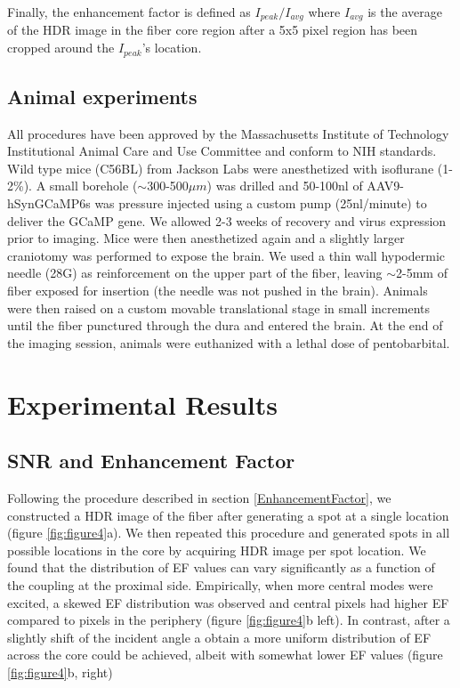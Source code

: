 \documentclass[10pt]{article}
\begin{document}
Finally, the enhancement factor is defined as $I_{peak} / I_{avg}$ where $I_{avg}$ is the average of the HDR image in the fiber core region after a 5x5 pixel region has been cropped around the $I_{peak}$'s location.

\subsection{Animal experiments}
All procedures have been approved by the Massachusetts Institute of Technology Institutional Animal Care and Use Committee and conform to NIH standards.
Wild type mice (C56BL) from Jackson Labs were anesthetized with isoflurane (1-2\%). A small borehole  ($\sim$300-500$\mu m$) was drilled and 50-100nl of AAV9-hSynGCaMP6s was pressure injected using a custom pump (25nl/minute) to deliver the GCaMP gene. We allowed 2-3 weeks of recovery and virus expression prior to imaging. Mice were then anesthetized again and a slightly larger
craniotomy was performed to expose the brain. We used a thin wall hypodermic needle (28G) as
reinforcement on the upper part of the fiber, leaving $\sim$2-5mm of fiber exposed for insertion (the needle was not pushed in the brain). Animals were then raised on a custom movable translational
stage in small increments until the fiber punctured through the dura and entered the brain. At the end of the imaging session, animals were euthanized with a lethal dose of pentobarbital. 

\section{Experimental Results}

\subsection{SNR and Enhancement Factor}
Following the procedure described in section \ref{EnhancementFactor}, we constructed a HDR image of the fiber after generating a spot at a single location (figure \ref{fig:figure4}a).
We then repeated this procedure and generated spots in all possible locations in the core by acquiring HDR image per spot location. We found that the distribution of EF values can vary significantly as a function of the coupling at the proximal side. Empirically, when more central modes were excited, a skewed EF distribution was observed and  central pixels had higher EF compared to pixels in the periphery (figure \ref{fig:figure4}b left). In contrast, after a slightly shift of the incident angle a obtain a more uniform distribution of EF across the core could be achieved, albeit with somewhat lower EF values (figure \ref{fig:figure4}b, right)
\end{document}

